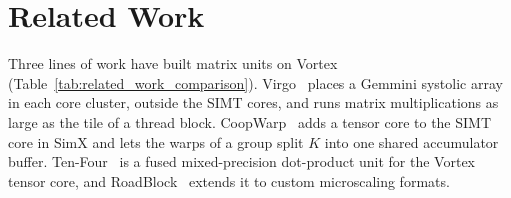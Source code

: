 \section{Related Work}
\label{sec:related}

Three lines of work have built matrix units on Vortex (Table~\ref{tab:related_work_comparison}). Virgo~\cite{kim2025virgo} places a Gemmini systolic array in each core cluster, outside the SIMT cores, and runs matrix multiplications as large as the tile of a thread block. CoopWarp~\cite{nada2025cooperative} adds a tensor core to the SIMT core in SimX and lets the warps of a group split $K$ into one shared accumulator buffer. Ten-Four~\cite{rout2026tenfouropensourcefuseddot} is a fused mixed-precision dot-product unit for the Vortex tensor core, and RoadBlock~\cite{rout2026roadblock} extends it to custom microscaling formats.

